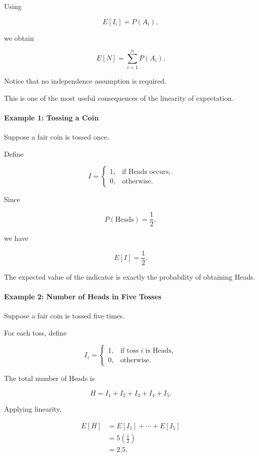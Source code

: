\documentclass[11pt]{article}
\begin{document}
\begin{mdframed}[
		linewidth=0.8pt,
		roundcorner=6pt,
		backgroundcolor=gray!5,
		linecolor=gray!60,
		innertopmargin=10pt,
		innerbottommargin=10pt,
		innerleftmargin=10pt,
		innerrightmargin=10pt
		]
		Using
		
		\[
		E[I_i]=P(A_i),
		\]
		
		we obtain
		
		\[
		\boxed{
			E[N]
			=
			\sum_{i=1}^{n}
			P(A_i).
		}
		\]
		
		Notice that no independence assumption is required.
		
		This is one of the most useful consequences of the linearity of expectation.
		
		\bigskip
		
		\paragraph{Example 1: Tossing a Coin}
		
		Suppose a fair coin is tossed once.
		
		Define
		
		\[
		I=
		\begin{cases}
			1,&\text{if Heads occurs},\\
			0,&\text{otherwise}.
		\end{cases}
		\]
		
		Since
		
		\[
		P(\text{Heads})=\frac12,
		\]
		
		we have
		
		\[
		\boxed{
			E[I]
			=
			\frac12.
		}
		\]
		
		The expected value of the indicator is exactly the probability of obtaining
		Heads.
		
		\bigskip
		
		\paragraph{Example 2: Number of Heads in Five Tosses}
		
		Suppose a fair coin is tossed five times.
		
		For each toss, define
		
		\[
		I_i=
		\begin{cases}
			1,&\text{if toss }i\text{ is Heads},\\
			0,&\text{otherwise}.
		\end{cases}
		\]
		
		The total number of Heads is
		
		\[
		H
		=
		I_1+I_2+I_3+I_4+I_5.
		\]
		
		Applying linearity,
		
		\[
		\begin{aligned}
			E[H]
			&=
			E[I_1]+\cdots+E[I_5]
			\\[0.3cm]
			&=
			5\left(\frac12\right)
			\\[0.3cm]
			&=
			2.5.
		\end{aligned}
		\]
		

\end{mdframed}
\end{document}

